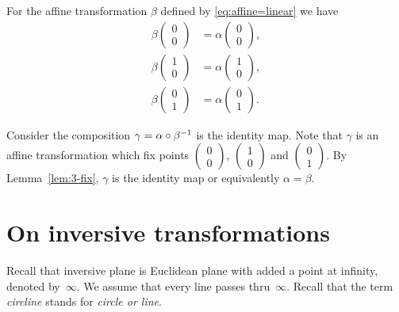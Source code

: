 For the affine transformation $\beta$ defined by \ref{eq:affine=linear}
we have 
\begin{align*}
\beta\left(\begin{smallmatrix}
0\\ 0
\end{smallmatrix} \right)
&=
\alpha\left(\begin{smallmatrix}
0\\ 0
\end{smallmatrix} \right),
\\
\beta\left(\begin{smallmatrix}
1\\ 0
\end{smallmatrix} \right)
&=
\alpha\left(\begin{smallmatrix}
1\\ 0
\end{smallmatrix} \right),
\\
\beta\left(\begin{smallmatrix}
0\\ 1
\end{smallmatrix} \right)
&=
\alpha\left(\begin{smallmatrix}
0\\ 1
\end{smallmatrix} \right).
\end{align*}


Consider the composition $\gamma\z=\alpha\circ \beta^{-1}$ is the identity map.
Note that $\gamma$ is an affine transformation which fix points $\left(\begin{smallmatrix}
0\\ 0
\end{smallmatrix} \right)$, 
$\left(\begin{smallmatrix}
1\\ 0
\end{smallmatrix} \right)$ 
and $\left(\begin{smallmatrix}
0\\ 1
\end{smallmatrix} \right)$.
By Lemma~\ref{lem:3-fix}, $\gamma$ is the identity map or equivalently $\alpha=\beta$.
\qeds

\section*{On inversive transformations}


Recall that inversive plane is Euclidean plane with added a point at infinity, denoted by~$\infty$.
We assume that every line passes thru~$\infty$.
Recall that the term {}\emph{circline} stands for {}\emph{circle or line}.

